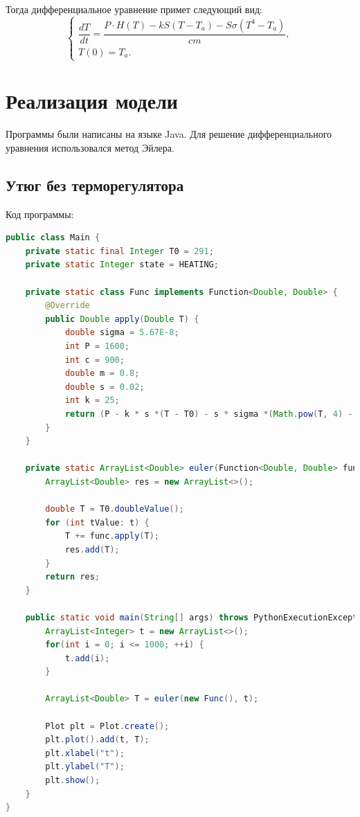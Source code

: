 \documentclass[a4paper, 14pt]{extarticle}
\begin{document}
		Тогда дифференциальное уравнение примет следующий вид:
		\[
		\begin{cases}
			\dfrac{dT}{dt} = \dfrac{ P\cdot H(T) - kS(T-T_a) - S \sigma (T^4 - T_a)}{cm},\\
			T(0) = T_a.
		\end{cases} \tag{2} \label{eq:2}
		\]
	
	\section{Реализация модели}
		\setlength\parindent{0pt}
		Программы были написаны на языке Java. Для решение дифференциального уравнения
		использовался метод Эйлера.
		\subsection{Утюг без терморегулятора}
			Код программы:
			\begin{lstlisting}[language=Java]
public class Main {
	private static final Integer T0 = 291;
	private static Integer state = HEATING;
	
	private static class Func implements Function<Double, Double> {
		@Override
		public Double apply(Double T) {
			double sigma = 5.67E-8;
			int P = 1600;
			int c = 900;
			double m = 0.8;
			double s = 0.02;
			int k = 25;
			return (P - k * s *(T - T0) - s * sigma *(Math.pow(T, 4) - Math.pow(T0, 4))) / c * m;
		}
	}
	
	private static ArrayList<Double> euler(Function<Double, Double> func, ArrayList<Integer> t) {
		ArrayList<Double> res = new ArrayList<>();
		
		double T = T0.doubleValue();
		for (int tValue: t) {
			T += func.apply(T);
			res.add(T);
		}
		return res;
	}
	
	public static void main(String[] args) throws PythonExecutionException, IOException {
		ArrayList<Integer> t = new ArrayList<>();
		for(int i = 0; i <= 1000; ++i) {
			t.add(i);
		}
		
		ArrayList<Double> T = euler(new Func(), t);
		
		Plot plt = Plot.create();
		plt.plot().add(t, T);
		plt.xlabel("t");
		plt.ylabel("T");
		plt.show();
	}
}
			\end{lstlisting}
\end{document}
